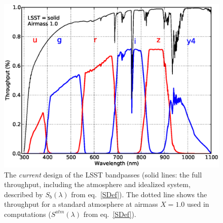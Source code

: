 \begin{figure}[h]\centering
\includegraphics[width=\textwidth]{filters_thruputs.ps}
\caption{The {\it current} design of the LSST bandpasses (solid lines:
the full throughput, including the atmosphere and idealized system,
described by $S_b(\lambda)$ from eq.~\ref{SDef}).
The dotted line shows the throughput for a standard atmosphere at
airmass $X=1.0$ used in computations ($S^{atm}(\lambda)$ from eq.~\ref{SDef}).}
\end{figure}


\newpage
{}

\bigskip

